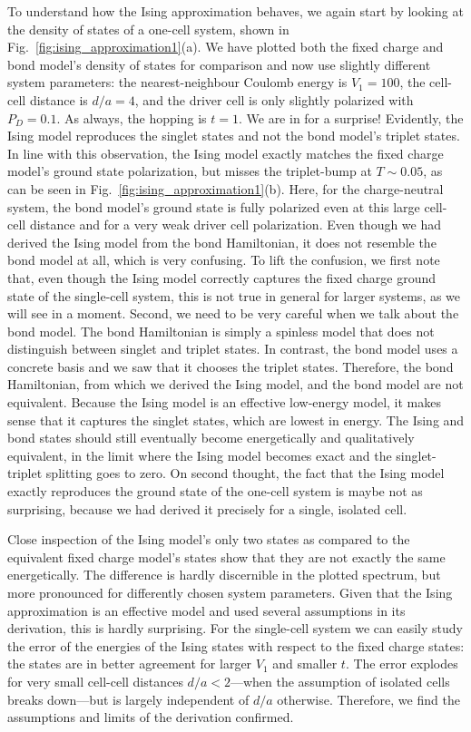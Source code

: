 To understand how the Ising approximation behaves, we again start by looking at
the density of states of a one-cell system, shown in
Fig.~\ref{fig:ising_approximation1}(a). We have plotted both the fixed charge
and bond model's density of states for comparison and now use slightly different
system parameters: the nearest-neighbour Coulomb energy is $V_1 = 100$, the
cell-cell distance is $d/a = 4$, and the driver cell is only slightly polarized
with $P_D = 0.1$. As always, the hopping is $t=1$. We are in for a surprise!
Evidently, the Ising model reproduces the singlet states and not the bond
model's triplet states. In line with this observation, the Ising model exactly
matches the fixed charge model's ground state polarization, but misses the
triplet-bump at $T \sim 0.05$, as can be seen in
Fig.~\ref{fig:ising_approximation1}(b). Here, for the charge-neutral system,
the bond model's ground state is fully polarized even at this large cell-cell
distance and for a very weak driver cell polarization. Even though we had
derived the Ising model from the bond Hamiltonian, it does not resemble the bond
model at all, which is very confusing. To lift the confusion, we first note
that, even though the Ising model correctly captures the fixed charge ground
state of the single-cell system, this is not true in general for larger systems,
as we will see in a moment. Second, we need to be very careful when we talk
about the bond model. The bond Hamiltonian is simply a spinless model that does
not distinguish between singlet and triplet states. In contrast, the bond model
uses a concrete basis and we saw that it chooses the triplet states. Therefore,
the bond Hamiltonian, from which we derived the Ising model, and the bond model
are not equivalent. Because the Ising model is an effective low-energy model, it
makes sense that it captures the singlet states, which are lowest in energy. The
Ising and bond states should still eventually become energetically and
qualitatively equivalent, in the limit where the Ising model becomes exact and
the singlet-triplet splitting goes to zero. On second thought, the fact that the
Ising model exactly reproduces the ground state of the one-cell system is maybe
not as surprising, because we had derived it precisely for a single, isolated
cell.

Close inspection of the Ising model's only two states as compared to the
equivalent fixed charge model's states show that they are not exactly the same
energetically. The difference is hardly discernible in the plotted spectrum, but
more pronounced for differently chosen system parameters. Given that the Ising
approximation is an effective model and used several assumptions in its
derivation, this is hardly surprising. For the single-cell system we can easily
study the error of the energies of the Ising states with respect to the fixed
charge states: the states are in better agreement for larger $V_1$ and smaller
$t$. The error explodes for very small cell-cell distances $d/a < 2$---when the
assumption of isolated cells breaks down---but is largely independent of $d/a$
otherwise. Therefore, we find the assumptions and limits of the derivation
confirmed.

